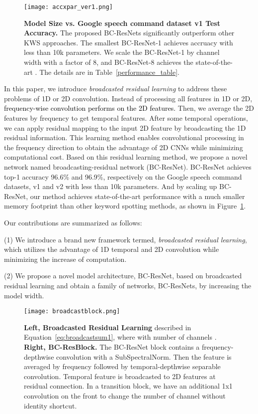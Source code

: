 \documentclass[a4paper]{article}
\newcommand\bg[1]{\textcolor{blue}{#1}}
\renewcommand\bg[1]{\textcolor{black}{#1}}
\begin{document}
\begin{figure}[t]
  \centering
  \texttt{[image: accxpar\_ver1.png]}
  \vskip -0.05in
  \caption{\textbf{Model Size vs. Google speech command dataset v1 Test Accuracy.} The proposed BC-ResNets significantly outperform other KWS approaches. The smallest BC-ResNet-1 achieves  accruacy with less than 10k parameters. We scale the BC-ResNet-1 by channel width with a factor of 8, and BC-ResNet-8 achieves the state-of-the-art . The details are in Table~\ref{performance_table}.}
  \label{accxpar}
\end{figure}

In this paper, we introduce \textit{broadcasted residual learning} to address these problems of 1D or 2D convolution. Instead of processing all features in 1D or 2D, 
\bg{frequency-wise convolution performs on the 2D features.}
Then, we average the 2D features by frequency to get temporal features. After some temporal operations, we can apply residual mapping to the input 2D feature by broadcasting the 1D residual information. This learning method enables convolutional processing in the frequency direction to obtain the advantage of 2D CNNs while minimizing computational cost. Based on this residual learning method, we propose a novel network named broadcasting-residual network (BC-ResNet). BC-ResNet achieves top-1 accuracy 96.6\% and 96.9\%, respectively on the Google speech command datasets, v1 and v2 \cite{speechdataset} with less than 10k parameters. And by scaling up BC-ResNet, our method achieves state-of-the-art performance with a much smaller memory footprint than other keyword spotting methods, as shown in Figure~\ref{accxpar}.

Our contributions are summarized as follows:

(1) We introduce a brand new framework termed, \textit{broadcasted residual learning}, which utilizes the advantage of 1D temporal and 2D convolution while minimizing the increase of computation.

(2) We propose a novel model architecture, BC-ResNet, based on broadcasted residual learning and obtain a family of networks, BC-ResNets, by increasing the model width.

\begin{figure*}[t]
  \centering
  \texttt{[image: broadcastblock.png]}
  \vskip -0.15in
  \caption{\textbf{Left, Broadcasted Residual Learning} described in Equation~\ref{eq:broadcastsum1}, where  with number of channels . \textbf{Right, BC-ResBlock.} The BC-ResNet block contains a frequency-depthwise convolution with a SubSpectralNorm. Then the feature is averaged by frequency followed by temporal-depthwise separable convolution. 
Temporal feature is broadcasted to 2D features at residual connection. In a transition block, we have an additional 1x1 convolution on the front to change the number of channel without identity shortcut.}
  \label{broadcastblock}
\end{figure*}
\end{document}
